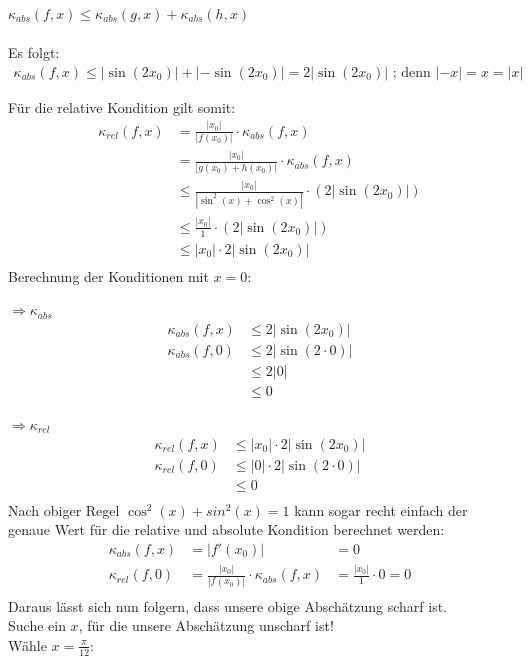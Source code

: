 \documentclass{llncs}
\begin{document}
$\kappa_{abs}(f,x)\le \kappa_{abs}(g,x) + \kappa_{abs}(h,x) $\\\\
Es folgt:\\
\begin{align*}
\kappa_{abs}(f,x)\le |\sin(2x_0)| + |-\sin(2x_0)| = 2|\sin(2x_0)|  \text{ ; denn } |-x|=x=|x|
\end{align*}


Für die relative Kondition gilt somit:
\begin{align*}
\kappa_{rel}(f,x) &= \frac{|x_0|}{|f(x_0)|}\cdot\kappa_{abs}(f,x)\\ 
&= \frac{|x_0|}{|g(x_0)+h(x_0)|}\cdot\kappa_{abs}(f,x)\\
&\le  \frac{|x_0|}{|\sin^2(x)+\cos^2(x)|}\cdot (2|\sin(2x_0)|)\\
&\le  \frac{|x_0|}{1}\cdot (2|\sin(2x_0)|)\\
&\le  |x_0|\cdot 2|\sin(2x_0)|\\
\end{align*} 
Berechnung der Konditionen mit $x=0$:

$\Rightarrow \kappa_{abs}$ 
\begin{align*}
\kappa_{abs}(f,x)&\le  2|\sin(2x_0)|\\  
\kappa_{abs}(f,0)&\le  2|\sin(2\cdot 0)|\\
&\le  2|0|\\
&\le  0
\end{align*}

$\Rightarrow \kappa_{rel}$ 
\begin{align*}
\kappa_{rel}(f,x) &\le  |x_0|\cdot 2|\sin(2x_0)|\\ 
\kappa_{rel}(f,0) &\le  |0|\cdot 2|\sin(2\cdot 0)|\\
 &\le  0\\
\end{align*}
Nach obiger Regel $\cos^2(x)+sin^2(x)=1$ kann sogar recht einfach der genaue Wert für die relative und absolute Kondition berechnet werden:\\
\begin{align*}
\kappa_{abs}(f,x) &= |f'(x_0)| &= 0  \\ 
\kappa_{rel}(f,0) &=\frac{|x_0|}{|f(x_0)|}\cdot\kappa_{abs}(f,x) &=  \frac{|x_0|}{1}\cdot 0 =0\\
\end{align*}
Daraus lässt sich nun folgern, dass unsere obige Abschätzung scharf ist.\\
Suche ein $x$, für die unsere Abschätzung unscharf ist!\\
Wähle $ x=\frac{\pi}{12}$:
\end{document}
